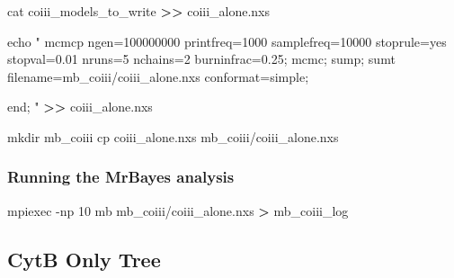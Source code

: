 \documentclass[
]{article}
\newenvironment{Shaded}{\begin{snugshade}}{\end{snugshade}}
\newcommand{\AttributeTok}[1]{\textcolor[rgb]{0.77,0.63,0.00}{#1}}
\newcommand{\BuiltInTok}[1]{#1}
\newcommand{\DecValTok}[1]{\textcolor[rgb]{0.00,0.00,0.81}{#1}}
\newcommand{\ExtensionTok}[1]{#1}
\newcommand{\FunctionTok}[1]{\textcolor[rgb]{0.00,0.00,0.00}{#1}}
\newcommand{\NormalTok}[1]{#1}
\newcommand{\OperatorTok}[1]{\textcolor[rgb]{0.81,0.36,0.00}{\textbf{#1}}}
\newcommand{\OtherTok}[1]{\textcolor[rgb]{0.56,0.35,0.01}{#1}}
\newcommand{\SpecialCharTok}[1]{\textcolor[rgb]{0.00,0.00,0.00}{#1}}
\newcommand{\StringTok}[1]{\textcolor[rgb]{0.31,0.60,0.02}{#1}}
\begin{document}
\begin{Shaded}
\begin{Highlighting}[]
\FunctionTok{cat}\NormalTok{ coiii\_models\_to\_write }\OperatorTok{\textgreater{}\textgreater{}}\NormalTok{ coiii\_alone.nxs}

\BuiltInTok{echo} \StringTok{"}
\StringTok{      mcmcp ngen=100000000 printfreq=1000 samplefreq=10000 stoprule=yes stopval=0.01 nruns=5 nchains=2 burninfrac=0.25;}
\StringTok{      mcmc;}
\StringTok{      sump;}
\StringTok{      sumt filename=mb\_coiii/coiii\_alone.nxs conformat=simple;}

\StringTok{end;}
\StringTok{"} \OperatorTok{\textgreater{}\textgreater{}}\NormalTok{ coiii\_alone.nxs}

\FunctionTok{mkdir}\NormalTok{ mb\_coiii}
\FunctionTok{cp}\NormalTok{ coiii\_alone.nxs mb\_coiii/coiii\_alone.nxs}
\end{Highlighting}
\end{Shaded}

\hypertarget{running-the-mrbayes-analysis-1}{%
\subsubsection{Running the MrBayes
analysis}\label{running-the-mrbayes-analysis-1}}

\begin{Shaded}
\begin{Highlighting}[]
\ExtensionTok{mpiexec} \AttributeTok{{-}np}\NormalTok{ 10 mb mb\_coiii/coiii\_alone.nxs }\OperatorTok{\textgreater{}}\NormalTok{ mb\_coiii\_log}
\end{Highlighting}
\end{Shaded}

\hypertarget{cytb-only-tree}{%
\subsection{CytB Only Tree}\label{cytb-only-tree}}

\begin{Shaded}
\end{Shaded}
\end{document}
